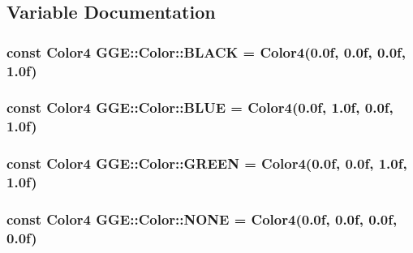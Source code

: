 \subsection{Variable Documentation}
\hypertarget{namespace_g_g_e_1_1_color_a88f2db25cc7bf1d38ee7fa3d87f01294}{
\subsubsection[{B\+L\+A\+C\+K}]{\setlength{\rightskip}{0pt plus 5cm}const {\bf Color4} G\+G\+E\+::\+Color\+::\+B\+L\+A\+C\+K = {\bf Color4}(0.\+0f, 0.\+0f, 0.\+0f, 1.\+0f)\hspace{0.3cm}{\ttfamily [static]}}}\label{namespace_g_g_e_1_1_color_a88f2db25cc7bf1d38ee7fa3d87f01294}
\hypertarget{namespace_g_g_e_1_1_color_a8d6c7c4aee508c3a1181009632277eb3}{
\subsubsection[{B\+L\+U\+E}]{\setlength{\rightskip}{0pt plus 5cm}const {\bf Color4} G\+G\+E\+::\+Color\+::\+B\+L\+U\+E = {\bf Color4}(0.\+0f, 1.\+0f, 0.\+0f, 1.\+0f)\hspace{0.3cm}{\ttfamily [static]}}}\label{namespace_g_g_e_1_1_color_a8d6c7c4aee508c3a1181009632277eb3}
\hypertarget{namespace_g_g_e_1_1_color_a26095ccaba67ad0c12df2b8731fa2c1a}{
\subsubsection[{G\+R\+E\+E\+N}]{\setlength{\rightskip}{0pt plus 5cm}const {\bf Color4} G\+G\+E\+::\+Color\+::\+G\+R\+E\+E\+N = {\bf Color4}(0.\+0f, 0.\+0f, 1.\+0f, 1.\+0f)\hspace{0.3cm}{\ttfamily [static]}}}\label{namespace_g_g_e_1_1_color_a26095ccaba67ad0c12df2b8731fa2c1a}
\hypertarget{namespace_g_g_e_1_1_color_aca92af9d049df379ee0b8eb327fe27f6}{
\subsubsection[{N\+O\+N\+E}]{\setlength{\rightskip}{0pt plus 5cm}const {\bf Color4} G\+G\+E\+::\+Color\+::\+N\+O\+N\+E = {\bf Color4}(0.\+0f, 0.\+0f, 0.\+0f, 0.\+0f)\hspace{0.3cm}{\ttfamily [static]}}}\label{namespace_g_g_e_1_1_color_aca92af9d049df379ee0b8eb327fe27f6}
